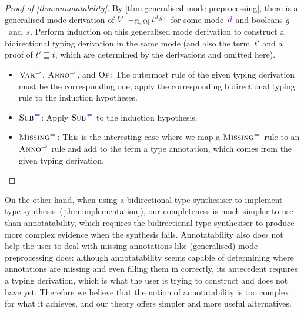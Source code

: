 \begin{proof}[Proof of \cref{thm:annotatability}]
By \cref{thm:generalised-mode-preprocessing}, there is a generalised mode derivation of $V |-_{\Sigma,\erase\Omega} t^{\dir{d}\,g\,s}$ for some mode~$\dir{d}$ and booleans $g$~and~$s$.
Perform induction on this generalised mode derivation to construct a bidirectional typing derivation in the same mode (and also the term~$t'$ and a proof of $t' \sqsupseteq t$, which are determined by the derivations and omitted here).
\begin{itemize}
\item $\SynRule{Var}$, $\SynRule{Anno}$, and $\textnormal{\textsc{Op}}$:
The outermost rule of the given typing derivation must be the corresponding one; apply the corresponding bidirectional typing rule to the induction hypotheses.
\item $\ChkRule{Sub}$:
Apply $\ChkRule{Sub}$ to the induction hypothesis.
\item $\SynRule{Missing}$:
This is the interesting case where we map a $\SynRule{Missing}$ rule to an $\SynRule{Anno}$ rule and add to the term a type annotation, which comes from the given typing derivation.
\vspace{-\topsep-\baselineskip}
\end{itemize}
\end{proof}

On the other hand, when using a bidirectional type synthesiser to implement type synthesis~(\cref{thm:implementation}), our completeness is much simpler to use than annotatability, which requires the bidirectional type synthesiser to produce more complex evidence when the synthesis fails.
Annotatability also does not help the user to deal with missing annotations like (generalised) mode preprocessing does: although annotatability seems capable of determining where annotations are missing and even filling them in correctly, its antecedent requires a typing derivation, which is what the user is trying to construct and does not have yet.
Therefore we believe that the notion of annotatability is too complex for what it achieves, and our theory offers simpler and more useful alternatives.
